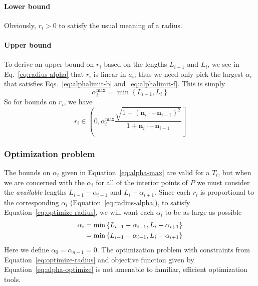 \documentclass{article}
\begin{document}
\paragraph{Lower bound}
%
Obviously, $r_i > 0$ to satisfy the usual meaning of a radius.
%
\paragraph{Upper bound}
%
To derive an upper bound on $r_{i}$ based on the lengths $L_{i-1}$ and $L_i$, we see in Eq.~\eqref{eq:radius-alpha} that $r_{i}$ is linear in $a_{i}$; thus we need only pick the largest $\alpha_i$ that satisfies Eqs.~\eqref{eq:alphalimit-b} and~\eqref{eq:alphalimit-f}.  This is simply
%
\begin{equation}
  \label{eq:alpha-max}
  \alpha^{\max}_i = \min \left\{L_{i-1}, L_{i}\right\}
\end{equation}
%
So for bounds on $r_{i}$, we have
%
\begin{equation}
  \label{eq:rbounds}
  r_{i} \in \left(0, \alpha^{\max}_i \frac{\sqrt{1-\left(\mathbf{n}_i\cdot -\mathbf{n}_{i-1}\right)^{2}}}{1+\mathbf{n}_i\cdot -\mathbf{n}_{i-1}}\right]
\end{equation}
%
\subsubsection{Optimization problem}
\label{sec:optimization}
%
The bounds on $\alpha_i$ given in Equation~\eqref{eq:alpha-max} are valid for a $T_{i}$, but when we are concerned with the $\alpha_i$ for all of the interior points of $P$ we must consider the \emph{available} lengths $L_{i-1}-\alpha_{i-1}$ and $L_{i}+\alpha_{i+1}$.  Since each $r_{i}$ is proportional to the corresponding $\alpha_i$ (Equation~\eqref{eq:radius-alpha}), to satisfy Equation~\eqref{eq:optimize-radius}, we will want each $\alpha_i$ to be as large as possible
%
\begin{align}
  \notag
  \alpha_i &= \min \left\{L_{i-1}-\alpha_{i-1}, L_{i}-\alpha_{i+1}\right\} \\
  \label{eq:alpha-optimize}
  &= \min \left\{L_{i-1}-\alpha_{i-1}, L_{i}-\alpha_{i+1}\right\}
\end{align}
%
Here we define $\alpha_0 = \alpha_{n-1} = 0$.  The optimization problem with constraints from Equation~\eqref{eq:optimize-radius} and objective function given by Equation~\eqref{eq:alpha-optimize} is not amenable to familiar, efficient optimization tools.
%
\end{document}
